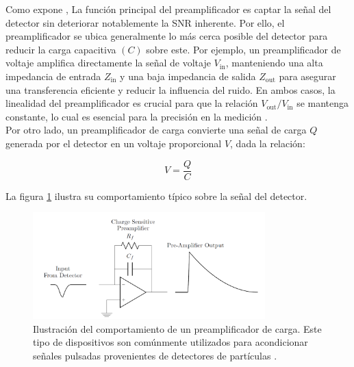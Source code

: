 \documentclass[]{book}
\begin{document}
\noindent Como expone \cite{knoll2010radiation}, La función principal del preamplificador es captar la señal del detector sin deteriorar notablemente la SNR inherente. Por ello, el preamplificador se ubica generalmente lo más cerca posible del detector para reducir la carga capacitiva $(C)$ sobre este. Por ejemplo, un preamplificador de voltaje amplifica directamente la señal de voltaje $V_{\text{in}}$, manteniendo una alta impedancia de entrada $Z_{\text{in}}$ y una baja impedancia de salida $Z_{\text{out}}$ para asegurar una transferencia eficiente y reducir la influencia del ruido. En ambos casos, la linealidad del preamplificador es crucial para que la relación $V_{\text{out}}/ V_{\text{in}}$ se mantenga constante, lo cual es esencial para la precisión en la medición \cite{leo1994techniques}.\\

\noindent Por otro lado, un preamplificador de carga convierte una señal de carga $Q$ generada por el detector en un voltaje proporcional $V$, dada la relación: 

\begin{equation}
    V = \frac{Q}{C}
\end{equation}

La figura \ref{fig:preamp} ilustra su comportamiento típico sobre la señal del detector.\\

\begin{figure}[h]
    \centering
    \includegraphics[width=0.8\textwidth]{preamp.PNG}
    \caption{Ilustración del comportamiento de un preamplificador de carga. Este tipo de dispositivos son comúnmente utilizados para acondicionar señales pulsadas provenientes de detectores de partículas \cite{kolanoski2020particle}.}
    \label{fig:preamp}

\end{figure}
\end{document}
